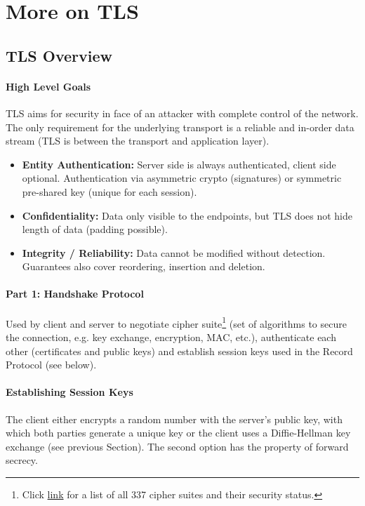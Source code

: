 \section{More on TLS}

\subsection{TLS Overview}

\paragraph{High Level Goals}
TLS aims for security in face of an attacker with complete control of the network. The only requirement for the underlying transport is a reliable and in-order data stream (TLS is between the transport and application layer).
\begin{itemize}
    \item \textbf{Entity Authentication:} Server side is always authenticated, client side optional. Authentication via asymmetric crypto (signatures) or symmetric pre-shared key (unique for each session).
    \item \textbf{Confidentiality:} Data only visible to the endpoints, but TLS does not hide length of data (padding possible).
    \item \textbf{Integrity / Reliability:} Data cannot be modified without detection. Guarantees also cover reordering, insertion and deletion.
\end{itemize}

\paragraph{Part 1: Handshake Protocol}
Used by client and server to negotiate cipher suite\footnote{Click \href{https://ciphersuite.info/cs/}{link} for a list of all 337 cipher suites and their security status.} (set of algorithms to secure the connection, e.g. key exchange, encryption, MAC, etc.), authenticate each other (certificates and public keys) and establish session keys used in the Record Protocol (see below).

\paragraph{Establishing Session Keys}
The client either encrypts a random number with the server's public key, with which both parties generate a unique key or the client uses a Diffie-Hellman key exchange (see previous Section). The second option has the property of forward secrecy.

